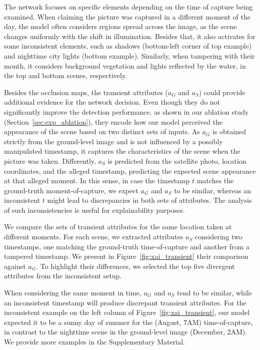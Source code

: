 \documentclass[journal]{IEEEtran}
\begin{document}
        The network focuses on specific elements depending on the time of capture being examined. When claiming the picture was captured in a different moment of the day, the model often considers regions spread across the image, as the scene changes uniformly with the shift in illumination. Besides that, it also activates for some inconsistent elements, such as shadows (bottom-left corner of top example) and nighttime city lights (bottom example). Similarly, when tampering with their month, it considers background vegetation and lights reflected by the water, in the top and bottom scenes, respectively.
        
        Besides the occlusion maps, the transient attributes ($a_{G}$ and $a_{S}$) could provide additional evidence for the network decision. Even though they do not significantly improve the detection performance, as shown in our ablation study (Section~\ref{sec:exp_ablation}), they encode how our model perceived the appearance of the scene based on two distinct sets of inputs. As $a_{G}$ is obtained strictly from the ground-level image and is not influenced by a possibly manipulated timestamp, it captures the characteristics of the scene when the picture was taken. Differently, $a_{S}$ is predicted from the satellite photo, location coordinates, and the alleged timestamp, predicting the expected scene appearance at that alleged moment. In this sense, in case the timestamp $t$ matches the ground-truth moment-of-capture, we expect $a_{G}$ and $a_{S}$ to be similar, whereas an inconsistent $t$ might lead to discrepancies in both sets of attributes. The analysis of such inconsistencies is useful for explainability purposes.
        
        We compare the sets of transient attributes for the same location taken at different moments. For each scene, we extracted attributes $a_{S}$ considering two timestamps, one matching the ground-truth time-of-capture and another from a tampered timestamp. We present in Figure~\ref{fig:xai_transient} their comparison against $a_{G}$. To highlight their differences, we selected the top five divergent attributes from the inconsistent setup.
        
        When considering the same moment in time, $a_G$ and $a_S$ tend to be similar, while an inconsistent timestamp will produce discrepant transient attributes. For the inconsistent example on the left column of Figure~\ref{fig:xai_transient}, our model expected it to be a sunny day of summer for the (August, $7$\textsc{AM}) time-of-capture, in contrast to the nighttime scene in the ground-level image (December, $2$\textsc{AM}). We provide more examples in the Supplementary Material.
        
\end{document}
